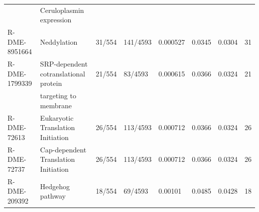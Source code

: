 \documentclass{article}
\begin{document}
\begin{landscape}
\begin{table}[]
\begin{tabular}{llllllll}
							& Ceruloplasmin expression									 \\
R-DME-8951664 & Neddylation                                & 31/554    & 141/4593 & 0.000527 & 0.0345   & 0.0304 & 31    \\
R-DME-1799339 & SRP-dependent cotranslational protein      & 21/554    & 83/4593  & 0.000615 & 0.0366   & 0.0324 & 21    \\
							& targeting to membrane											 \\
R-DME-72613   & Eukaryotic Translation Initiation          & 26/554    & 113/4593 & 0.000712 & 0.0366   & 0.0324 & 26    \\
R-DME-72737   & Cap-dependent Translation Initiation       & 26/554    & 113/4593 & 0.000712 & 0.0366   & 0.0324 & 26    \\
R-DME-209392  & Hedgehog pathway                           & 18/554    & 69/4593  & 0.00101  & 0.0485   & 0.0428 & 18   
\end{tabular}
\end{table}\end{landscape}
\end{document}
